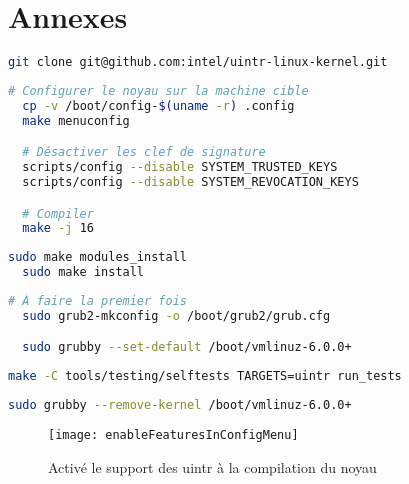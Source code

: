\newpage

\section{Annexes}

\begin{lstlisting}[language=bash, caption=Récupération du code source du noyau Linux patché]
  git clone git@github.com:intel/uintr-linux-kernel.git
\end{lstlisting}

\begin{lstlisting}[language=bash, caption=Configurer et compiler le noyau]
  # Configurer le noyau sur la machine cible
  cp -v /boot/config-$(uname -r) .config
  make menuconfig

  # Désactiver les clef de signature
  scripts/config --disable SYSTEM_TRUSTED_KEYS
  scripts/config --disable SYSTEM_REVOCATION_KEYS

  # Compiler
  make -j 16
\end{lstlisting}

\begin{lstlisting}[language=bash, caption=Installer le noyau]
  sudo make modules_install
  sudo make install
\end{lstlisting}

\begin{lstlisting}[language=bash, caption=Utiliser le noyau installé]
  # À faire la premier fois
  sudo grub2-mkconfig -o /boot/grub2/grub.cfg

  sudo grubby --set-default /boot/vmlinuz-6.0.0+
\end{lstlisting}

\begin{lstlisting}[language=bash, caption=Lancer les tests uintr du noyau (le noyau doit être installé)]
  make -C tools/testing/selftests TARGETS=uintr run_tests
\end{lstlisting}

\begin{lstlisting}[language=bash, caption=Supprimer le noyau installé]
  sudo grubby --remove-kernel /boot/vmlinuz-6.0.0+
\end{lstlisting}

\begin{figure}[H]
  \texttt{[image: enableFeaturesInConfigMenu]}
  \caption{Activé le support des uintr à la compilation du noyau}
  \label{fig:enableFeaturesInConfigMenu}
\end{figure}

